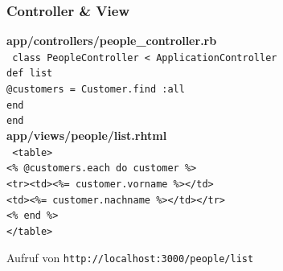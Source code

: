 \begin{frame}
  \frametitle{Controller \& View}
  {\bf \small app/controllers/people\_controller.rb}\\
  { \tt \small
    class {\color{red}People}Controller < ApplicationController \\
    \enskip def {\color{green}list} \\
    \enskip \enskip @customers = Customer.find :all \\
    \enskip end \\
    end \\
  }
  \pause
  \vspace{0.3cm}
  {\small \bf app/views/people/list.rhtml} \\
  { \tt \small
    <table> \\
    \enskip <\% @customers.each do customer \%> \\
    \enskip \enskip <tr><td><\%= customer.vorname \%></td> \\
    \enskip \enskip \enskip <td><\%= customer.nachname \%></td></tr> \\
    \enskip <\% end \%> \\
    </table>
  }
  \pause
  \begin{center}
    Aufruf von {\tt http://localhost:3000/{\color{red}people}/{\color{green}list}}
  \end{center}
\end{frame}

